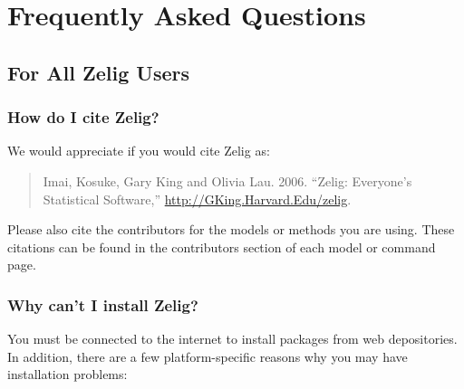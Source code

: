 \chapter{Frequently Asked Questions}

\section{For All Zelig Users}

\subsection*{How do I cite Zelig?}
We would appreciate if you would cite Zelig as:  
\begin{verse}
  Imai, Kosuke, Gary King and Olivia Lau.  2006.  ``Zelig:
  Everyone's Statistical Software,''   \url{http://GKing.Harvard.Edu/zelig}.
\end{verse}
Please also cite the contributors for the models or methods you are
using.  These citations can be found in the contributors section of
each model or command page.

\subsection*{Why can't I install Zelig?}

You must be connected to the internet to install packages from web
depositories.  In addition, there are a few platform-specific reasons
why you may have installation problems:


